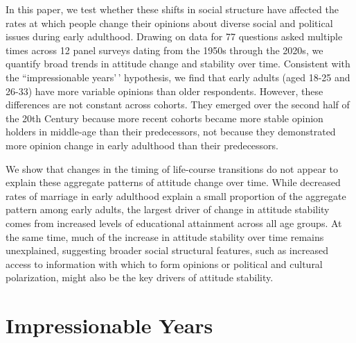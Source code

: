 \documentclass[
  12pt,
]{article}
\begin{document}
In this paper, we test whether these shifts in social structure have affected the rates at which people change their opinions about diverse social and political issues during early adulthood. Drawing on data for 77 questions asked multiple times across 12 panel surveys dating from the 1950s through the 2020s, we quantify broad trends in attitude change and stability over time. Consistent with the ``impressionable years'\,' hypothesis, we find that early adults (aged 18-25 and 26-33) have more variable opinions than older respondents. However, these differences are not constant across cohorts. They emerged over the second half of the 20th Century because more recent cohorts became more stable opinion holders in middle-age than their predecessors, not because they demonstrated more opinion change in early adulthood than their predecessors.

We show that changes in the timing of life-course transitions do not appear to explain these aggregate patterns of attitude change over time. While decreased rates of marriage in early adulthood explain a small proportion of the aggregate pattern among early adults, the largest driver of change in attitude stability comes from increased levels of educational attainment across all age groups. At the same time, much of the increase in attitude stability over time remains unexplained, suggesting broader social structural features, such as increased access to information with which to form opinions or political and cultural polarization, might also be the key drivers of attitude stability.

\hypertarget{impressionable-years}{%
\section{Impressionable Years}\label{impressionable-years}}
\end{document}
